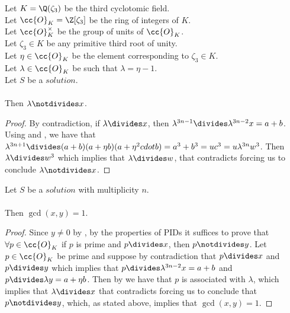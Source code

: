 \begin{lemma}
  \label{lmm:lambda_not_dvd_x}
  \leanok
  Let $K = \Q(\zeta_3)$ be the third cyclotomic field. \\
  Let $\cc{O}_K = \Z[\zeta_3]$ be the ring of integers of $K$. \\
  Let $\cc{O}^\times_K$ be the group of units of $\cc{O}_K$. \\
  Let $\zeta_3 \in K$ be any primitive third root of unity. \\
  Let $\eta \in \cc{O}_K$ be the element corresponding to $\zeta_3 \in K$. \\
  Let $\lambda \in \cc{O}_K$ be such that $\lambda = \eta -1$. \\
  Let $S$ be a $solution$.\\\\
  Then $\lambda \notdivides x$.
\end{lemma}
\begin{proof}
  \leanok
  By contradiction, if $\lambda \divides x$, then
  $\lambda^{3n-1} \divides \lambda^{3n-2}  x = a+b$. Using 
  and , we have that $\lambda^{3n+1} \divides
  (a+b)  (a + \eta  b)  (a + \eta^2 cdot b) = a^3+b^3
  = u c^3 = u \lambda^{3n} w^3$.
  Then $\lambda \divides w^3$ which implies that $\lambda \divides w$, that
  contradicts  forcing us to conclude $\lambda \notdivides x$.
\end{proof}

\begin{lemma}
  \label{lmm:coprime_x_y}
  \leanok
  Let $S$ be a $solution$ with multiplicity $n$.\\\\
  Then $\gcd(x,y) = 1$.
\end{lemma}
\begin{proof}
  \leanok
  Since $y \neq 0$ by , by the properties of PIDs it suffices to prove that
  $\forall p \in \cc{O}_K$ if $p$ is prime and $p \divides x$, then $p \notdivides y$.
  Let $p \in \cc{O}_K$ be prime and suppose by contradiction that $p \divides x$ and $p \divides y$
  which implies that $p \divides \lambda^{3n-2} x = a+b$ and $p \divides \lambda y = a + \eta b$.
  Then by 
  we have that $p$ is associated with $\lambda$, which implies that $\lambda \divides x$
  that contradicts  forcing us to conclude that $p \notdivides y$, which,
  as stated above, implies that $\gcd(x,y)=1$.
\end{proof}

